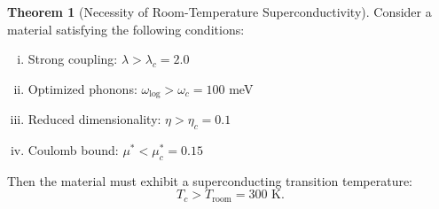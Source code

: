 \documentclass[11pt,a4paper]{article}
\theoremstyle{definition}
\newtheorem{theorem}{Theorem}[section]
\begin{document}
\begin{theorem}[Necessity of Room-Temperature Superconductivity]\label{thm:main}
Consider a material satisfying the following conditions:
\begin{enumerate}[(i)]
\item Strong coupling: $\lambda > \lambda_c = 2.0$
\item Optimized phonons: $\omega_{\text{log}} > \omega_c = 100$ meV
\item Reduced dimensionality: $\eta > \eta_c = 0.1$
\item Coulomb bound: $\mu^* < \mu_c^* = 0.15$
\end{enumerate}
Then the material must exhibit a superconducting transition temperature:
\begin{equation}
T_c > T_{\text{room}} = 300 \text{ K}.
\end{equation}
\end{theorem}
\end{document}
